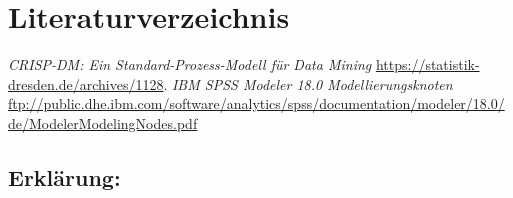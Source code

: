 \documentclass[a4paper,12pt]{article}
\begin{document}
\newpage
\section{Literaturverzeichnis}
\thispagestyle{plain}
\begin{thebibliography}{DiplRS}
 {\it CRISP-DM: Ein Standard-Prozess-Modell für Data Mining} \url{ https://statistik-dresden.de/archives/1128}.
 {\it IBM SPSS Modeler 18.0 Modellierungsknoten} 
\url{ftp://public.dhe.ibm.com/software/analytics/spss/documentation/modeler/18.0/de/ModelerModelingNodes.pdf}
\end{thebibliography}

\newpage
\begin{titlepage}
\section*{Erklärung:}

\vfill
\end{titlepage}
\end{document}
